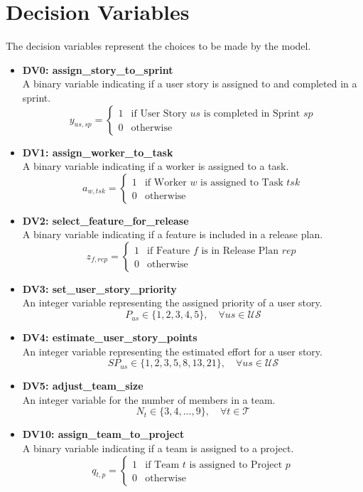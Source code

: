 \documentclass[11pt]{article}
\begin{document}
\section{Decision Variables}
The decision variables represent the choices to be made by the model.

\begin{itemize}
    \item \textbf{DV0: assign\_story\_to\_sprint} \\
    A binary variable indicating if a user story is assigned to and completed in a sprint.
    $$ y_{us, sp} = \begin{cases} 1 & \text{if User Story } us \text{ is completed in Sprint } sp \\ 0 & \text{otherwise} \end{cases} $$
    
    \item \textbf{DV1: assign\_worker\_to\_task} \\
    A binary variable indicating if a worker is assigned to a task.
    $$ a_{w, tsk} = \begin{cases} 1 & \text{if Worker } w \text{ is assigned to Task } tsk \\ 0 & \text{otherwise} \end{cases} $$

    \item \textbf{DV2: select\_feature\_for\_release} \\
    A binary variable indicating if a feature is included in a release plan.
    $$ z_{f, rep} = \begin{cases} 1 & \text{if Feature } f \text{ is in Release Plan } rep \\ 0 & \text{otherwise} \end{cases} $$

    \item \textbf{DV3: set\_user\_story\_priority} \\
    An integer variable representing the assigned priority of a user story.
    $$ P_{us} \in \{1, 2, 3, 4, 5\}, \quad \forall us \in \mathcal{US} $$
    
    \item \textbf{DV4: estimate\_user\_story\_points} \\
    An integer variable representing the estimated effort for a user story.
    $$ SP_{us} \in \{1, 2, 3, 5, 8, 13, 21\}, \quad \forall us \in \mathcal{US} $$

    \item \textbf{DV5: adjust\_team\_size} \\
    An integer variable for the number of members in a team.
    $$ N_{t} \in \{3, 4, ..., 9\}, \quad \forall t \in \mathcal{T} $$

    \item \textbf{DV10: assign\_team\_to\_project} \\
    A binary variable indicating if a team is assigned to a project.
    $$ q_{t, p} = \begin{cases} 1 & \text{if Team } t \text{ is assigned to Project } p \\ 0 & \text{otherwise} \end{cases} $$
\end{itemize}
\end{document}
